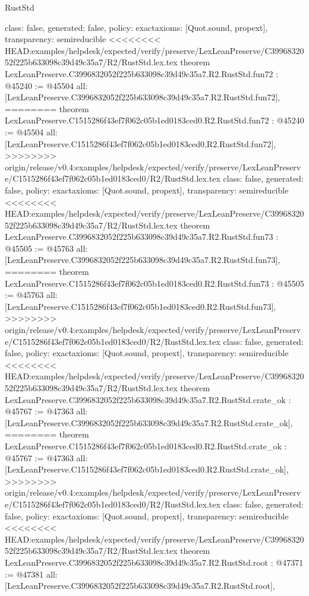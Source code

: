 \begin{lexlean}{RustStd}
\begin{coremodule}
{\begin{coremodule}
{{{{{{{{{{{{{{{{{{{{{{{{{{{{{{{{{{{{{{{{{{{{{{{{{{{{{{{{{{{{{{{{{{{{{{{{{{{  class: false,
  generated: false,
  policy: exact{axioms: [Quot.sound, propext]},
  transparency: semireducible
}
<<<<<<<< HEAD:examples/helpdesk/expected/verify/preserve/LexLeanPreserve/C3996832052f225b633098c39d49c35a7/R2/RustStd.lex.tex
theorem LexLeanPreserve.C3996832052f225b633098c39d49c35a7.R2.RustStd.fun72 : @45240 := @45504 {
  all: [LexLeanPreserve.C3996832052f225b633098c39d49c35a7.R2.RustStd.fun72],
========
theorem LexLeanPreserve.C1515286f43ef7f062c05b1ed0183ced0.R2.RustStd.fun72 : @45240 := @45504 {
  all: [LexLeanPreserve.C1515286f43ef7f062c05b1ed0183ced0.R2.RustStd.fun72],
>>>>>>>> origin/release/v0.4:examples/helpdesk/expected/verify/preserve/LexLeanPreserve/C1515286f43ef7f062c05b1ed0183ced0/R2/RustStd.lex.tex
  class: false,
  generated: false,
  policy: exact{axioms: [Quot.sound, propext]},
  transparency: semireducible
}
<<<<<<<< HEAD:examples/helpdesk/expected/verify/preserve/LexLeanPreserve/C3996832052f225b633098c39d49c35a7/R2/RustStd.lex.tex
theorem LexLeanPreserve.C3996832052f225b633098c39d49c35a7.R2.RustStd.fun73 : @45505 := @45763 {
  all: [LexLeanPreserve.C3996832052f225b633098c39d49c35a7.R2.RustStd.fun73],
========
theorem LexLeanPreserve.C1515286f43ef7f062c05b1ed0183ced0.R2.RustStd.fun73 : @45505 := @45763 {
  all: [LexLeanPreserve.C1515286f43ef7f062c05b1ed0183ced0.R2.RustStd.fun73],
>>>>>>>> origin/release/v0.4:examples/helpdesk/expected/verify/preserve/LexLeanPreserve/C1515286f43ef7f062c05b1ed0183ced0/R2/RustStd.lex.tex
  class: false,
  generated: false,
  policy: exact{axioms: [Quot.sound, propext]},
  transparency: semireducible
}
<<<<<<<< HEAD:examples/helpdesk/expected/verify/preserve/LexLeanPreserve/C3996832052f225b633098c39d49c35a7/R2/RustStd.lex.tex
theorem LexLeanPreserve.C3996832052f225b633098c39d49c35a7.R2.RustStd.crate_ok : @45767 := @47363 {
  all: [LexLeanPreserve.C3996832052f225b633098c39d49c35a7.R2.RustStd.crate_ok],
========
theorem LexLeanPreserve.C1515286f43ef7f062c05b1ed0183ced0.R2.RustStd.crate_ok : @45767 := @47363 {
  all: [LexLeanPreserve.C1515286f43ef7f062c05b1ed0183ced0.R2.RustStd.crate_ok],
>>>>>>>> origin/release/v0.4:examples/helpdesk/expected/verify/preserve/LexLeanPreserve/C1515286f43ef7f062c05b1ed0183ced0/R2/RustStd.lex.tex
  class: false,
  generated: false,
  policy: exact{axioms: [Quot.sound, propext]},
  transparency: semireducible
}
<<<<<<<< HEAD:examples/helpdesk/expected/verify/preserve/LexLeanPreserve/C3996832052f225b633098c39d49c35a7/R2/RustStd.lex.tex
theorem LexLeanPreserve.C3996832052f225b633098c39d49c35a7.R2.RustStd.root : @47371 := @47381 {
  all: [LexLeanPreserve.C3996832052f225b633098c39d49c35a7.R2.RustStd.root],
}}}}}}}}}}}}}}}}}}}}}}}}}}}}}}}}}}}}}}}}}}}}}}}}}}}}}}}}}}}}}}}}}}}}}}}}}}}}}}
\end{coremodule}}
\end{coremodule}
\end{lexlean}
